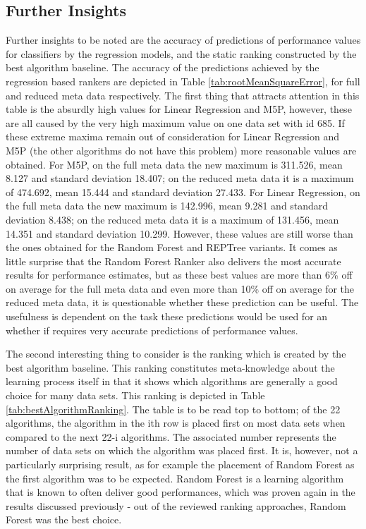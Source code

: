 

\subsection{Further Insights}

Further insights to be noted are the accuracy of predictions of performance values for classifiers by the regression models, and the static ranking constructed by the best algorithm baseline. The accuracy of the predictions achieved by the regression based rankers are depicted in Table \ref{tab:rootMeanSquareError}, for full and reduced meta data respectively. The first thing that attracts attention in this table is the absurdly high values for Linear Regression and M5P, however, these are all caused by the very high maximum value on one data set with id 685. If these extreme maxima remain out of consideration for Linear Regression and M5P (the other algorithms do not have this problem) more reasonable values are obtained. For M5P, on the full meta data the new maximum is 311.526, mean 8.127 and standard deviation 18.407; on the reduced meta data it is a maximum of 474.692, mean 15.444 and standard deviation 27.433. For Linear Regression, on the full meta data the new maximum is 142.996, mean 9.281 and standard deviation 8.438; on the reduced meta data it is a maximum of 131.456, mean 14.351 and standard deviation 10.299. However, these values are still worse than the ones obtained for the Random Forest and REPTree variants. It comes as little surprise that the Random Forest Ranker also delivers the most accurate results for performance estimates, but as these best values are more than 6\% off on average for the full meta data and even more than 10\% off on average for the reduced meta data, it is questionable whether these prediction can be useful. The usefulness is dependent on the task these predictions would be used for an whether if requires very accurate predictions of performance values.



The second interesting thing to consider is the ranking which is created by the best algorithm baseline. This ranking constitutes meta-knowledge about the learning process itself in that it shows which algorithms are generally a good choice for many data sets. This ranking is depicted in Table \ref{tab:bestAlgorithmRanking}. The table is to be read top to bottom; of the 22 algorithms, the algorithm in the ith row is placed first on most data sets when compared to the next 22-i algorithms. The associated number represents the number of data sets on which the algorithm was placed first. It is, however, not a particularly surprising result, as for example the placement of Random Forest as the first algorithm was to be expected. Random Forest is a learning algorithm that is known to often deliver good performances, which was proven again in the results discussed previously - out of the reviewed ranking approaches, Random Forest was the best choice.










